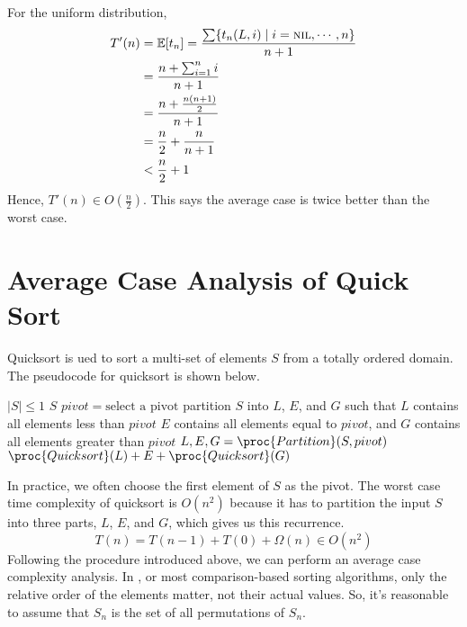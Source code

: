 \begin{enumerate}
    For the uniform distribution,
    $$
    \begin{aligned}
        T'(n) &= \operatorname*{\mathbb{E}}[t_n] = \frac{\sum \{ t_n(L,i) \mid i = \textsc{nil},\cdots,n \}}{n+1} \\
        &= \frac{n + \sum_{i=1}^n i}{n+1} \\
        &= \frac{n + \frac{n(n+1)}{2}}{n+1} \\
        &= \frac{n}{2} + \frac{n}{n+1} \\
        &< \frac{n}{2} + 1 
    \end{aligned}
    $$
    Hence, $\displaystyle T'(n) \in O(\frac{n}{2})$. This says the average case is twice better than the worst case.
\end{enumerate}

\section{Average Case Analysis of Quick Sort} 

Quicksort is ued to sort a multi-set of elements $S$ from a totally ordered domain. The pseudocode for quicksort is shown below.

\begin{codebox}
    \li \If $|S| \leq 1$
    \li \Then \Return $S$ \End
    \li $pivot = \text{select a pivot}$
    \zi \Comment partition $S$ into $L$, $E$, and $G$ such that $L$ contains all elements less than $pivot$
    \zi \Comment $E$ contains all elements equal to $pivot$, and $G$ contains all elements greater than $pivot$
    \li $L,E,G = \proc{Partition}(S,pivot)$
    \li \Return $\proc{Quicksort}(L) + E + \proc{Quicksort}(G)$
\end{codebox}

In practice, we often choose the first element of $S$ as the pivot. The worst case time complexity of quicksort is $O(n^2)$ because it has to partition the input $S$ into three parts, $L$, $E$, and $G$, which gives us this recurrence.
$$
T(n) = T(n-1) + T(0) + \Omega(n) \in O(n^2)
$$
Following the procedure introduced above, we can perform an average case complexity analysis. In , or most comparison-based sorting algorithms, only the relative order of the elements matter, not their actual values. So, it's reasonable to assume that $S_n$ is the set of all permutations of $S_n$.

